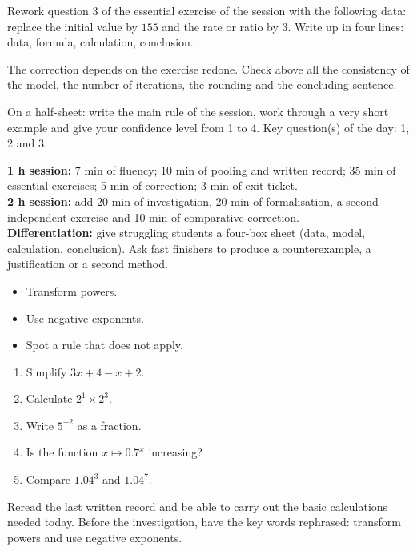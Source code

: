 
\begin{homework}Rework question 3 of the essential exercise of the session with the following data: replace the initial value by $155$ and the rate or ratio by $3$. Write up in four lines: data, formula, calculation, conclusion.\end{homework}
\begin{solution}The correction depends on the exercise redone. Check above all the consistency of the model, the number of iterations, the rounding and the concluding sentence.\end{solution}

\begin{exitticket}[3 minutes]On a half-sheet: write the main rule of the session, work through a very short example and give your confidence level from 1 to 4. Key question(s) of the day: 1, 2 and 3.\end{exitticket}

\ifmxteacher
\begin{method}
\textbf{1 h session:} 7 min of fluency; 10 min of pooling and written record; 35 min of essential exercises; 5 min of correction; 3 min of exit ticket.\\
\textbf{2 h session:} add 20 min of investigation, 20 min of formalisation, a second independent exercise and 10 min of comparative correction.\\
\textbf{Differentiation:} give struggling students a four-box sheet (data, model, calculation, conclusion). Ask fast finishers to produce a counterexample, a justification or a second method.
\end{method}
\fi
{}
\begin{objectives}\begin{itemize}\item Transform powers.\item Use negative exponents.\item Spot a rule that does not apply.\end{itemize}\end{objectives}
\begin{fluency}\begin{enumerate}\item Simplify $3x+4-x+2$. \item Calculate $2^1\times2^3$. \item Write $5^{-2}$ as a fraction. \item Is the function $x\mapsto\num{0,7}^x$ increasing? \item Compare $\num{1,04}^3$ and $\num{1,04}^7$. \end{enumerate}\end{fluency}
\begin{prerequisites}Reread the last written record and be able to carry out the basic calculations needed today. Before the investigation, have the key words rephrased: transform powers and use negative exponents.\end{prerequisites}

